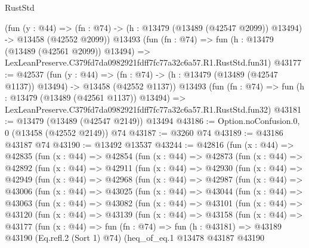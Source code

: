 \begin{lexlean}{RustStd}
\begin{coremodule}
    (fun (y : @44) =>
    (fn : @74) -> (h : @13479 (@13489 (@42547 @2099)) @13494) -> @13458 (@42552 @2099))
    @13493
    (fun (fn : @74) =>
    fun (h : @13479 (@13489 (@42561 @2099)) @13494) =>
    LexLeanPreserve.C379fd7da0982921fdff7fc77a32c6a57.R1.RustStd.fun31)
@43177 := @42537
    (fun (y : @44) =>
    (fn : @74) -> (h : @13479 (@13489 (@42547 @1137)) @13494) -> @13458 (@42552 @1137))
    @13493
    (fun (fn : @74) =>
    fun (h : @13479 (@13489 (@42561 @1137)) @13494) =>
    LexLeanPreserve.C379fd7da0982921fdff7fc77a32c6a57.R1.RustStd.fun32)
@43181 := @13479 (@13489 (@42547 @2149)) @13494
@43186 := Option.noConfusion.{0, 0} (@13458 (@42552 @2149)) @74
@43187 := @3260 @74
@43189 := @43186 @43187 @74
@43190 := @13492 @13537
@43244 := @42816
    (fun (x : @44) =>
    @42835
      (fun (x : @44) =>
      @42854
        (fun (x : @44) =>
        @42873
          (fun (x : @44) =>
          @42892
            (fun (x : @44) =>
            @42911
              (fun (x : @44) =>
              @42930
                (fun (x : @44) =>
                @42949
                  (fun (x : @44) =>
                  @42968
                    (fun (x : @44) =>
                    @42987
                      (fun (x : @44) =>
                      @43006
                        (fun (x : @44) =>
                        @43025
                          (fun (x : @44) =>
                          @43044
                            (fun (x : @44) =>
                            @43063
                              (fun (x : @44) =>
                              @43082
                                (fun (x : @44) =>
                                @43101
                                  (fun (x : @44) =>
                                  @43120
                                    (fun (x : @44) =>
                                    @43139
                                      (fun (x : @44) =>
                                      @43158
                                        (fun (x : @44) =>
                                        @43177
                                          (fun (x : @44) =>
                                          fun (fn : @74) =>
                                          fun (h : @43181) =>
                                          @43189
                                            @43190
                                            (Eq.refl.{2} (Sort 1) @74)
                                            (heq_of_eq.{1}
                                              @13478
                                              @43187
                                              @43190

\end{coremodule}
\end{lexlean}
